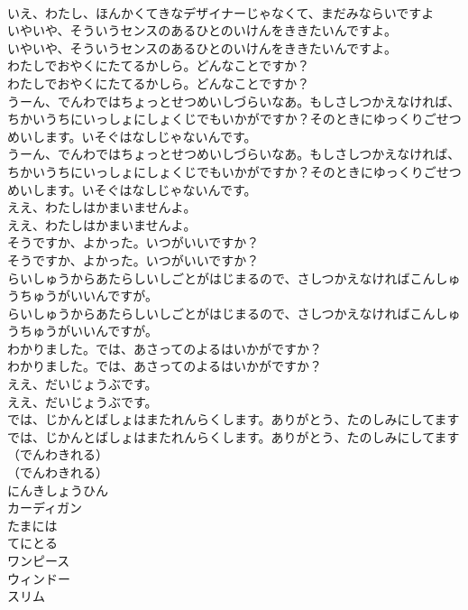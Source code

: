 \documentclass[8pt]{extreport}
\begin{document}
\begin{CJK}{UTF8}{min}
\\	いえ、わたし、ほんかくてきなデザイナーじゃなくて、まだみならいですよ
\\	いやいや、そういうセンスのあるひとのいけんをききたいんですよ。
\\	いやいや、そういうセンスのあるひとのいけんをききたいんですよ。
\\	わたしでおやくにたてるかしら。どんなことですか？
\\	わたしでおやくにたてるかしら。どんなことですか？
\\	うーん、でんわではちょっとせつめいしづらいなあ。もしさしつかえなければ、ちかいうちにいっしょにしょくじでもいかがですか？そのときにゆっくりごせつめいします。いそぐはなしじゃないんです。
\\	うーん、でんわではちょっとせつめいしづらいなあ。もしさしつかえなければ、ちかいうちにいっしょにしょくじでもいかがですか？そのときにゆっくりごせつめいします。いそぐはなしじゃないんです。
\\	ええ、わたしはかまいませんよ。
\\	ええ、わたしはかまいませんよ。
\\	そうですか、よかった。いつがいいですか？
\\	そうですか、よかった。いつがいいですか？
\\	らいしゅうからあたらしいしごとがはじまるので、さしつかえなければこんしゅうちゅうがいいんですが。
\\	らいしゅうからあたらしいしごとがはじまるので、さしつかえなければこんしゅうちゅうがいいんですが。
\\	わかりました。では、あさってのよるはいかがですか？
\\	わかりました。では、あさってのよるはいかがですか？
\\	ええ、だいじょうぶです。
\\	ええ、だいじょうぶです。
\\	では、じかんとばしょはまたれんらくします。ありがとう、たのしみにしてます
\\	では、じかんとばしょはまたれんらくします。ありがとう、たのしみにしてます
\\	（でんわきれる）
\\	（でんわきれる）
\\	にんきしょうひん
\\	カーディガン
\\	たまには
\\	てにとる
\\	ワンピース
\\	ウィンドー
\\	スリム

\end{CJK}
\end{document}
